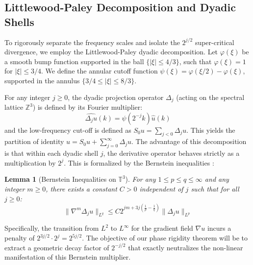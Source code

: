 \documentclass[12pt,a4paper]{article}
\theoremstyle{plain}
\newtheorem{lemma}[theorem]{Lemma}
\theoremstyle{definition}
\theoremstyle{remark}
\begin{document}
\subsection{Littlewood-Paley Decomposition and Dyadic Shells}
To rigorously separate the frequency scales and isolate the $2^{j/2}$ super-critical divergence, we employ the Littlewood-Paley dyadic decomposition. Let $\varphi(\xi)$ be a smooth bump function supported in the ball $\{|\xi| \leq 4/3\}$, such that $\varphi(\xi) = 1$ for $|\xi| \leq 3/4$. We define the annular cutoff function $\psi(\xi) = \varphi(\xi/2) - \varphi(\xi)$, supported in the annulus $\{3/4 \leq |\xi| \leq 8/3\}$.

For any integer $j \geq 0$, the dyadic projection operator $\Delta_j$ (acting on the spectral lattice $\mathbb{Z}^3$) is defined by its Fourier multiplier:
\begin{equation}
    \widehat{\Delta_j u}(k) = \psi(2^{-j} k) \hat{u}(k)
\end{equation}
and the low-frequency cut-off is defined as $S_0 u = \sum_{j < 0} \Delta_j u$. This yields the partition of identity $u = S_0 u + \sum_{j=0}^\infty \Delta_j u$. The advantage of this decomposition is that within each dyadic shell $j$, the derivative operator behaves strictly as a multiplication by $2^j$. This is formalized by the Bernstein inequalities \cite{chemin2004}:

\begin{lemma}[Bernstein Inequalities on $\mathbb{T}^3$]\label{lem:bernstein}
For any $1 \leq p \leq q \leq \infty$ and any integer $m \geq 0$, there exists a constant $C > 0$ independent of $j$ such that for all $j \geq 0$:
\begin{equation}
    \|\nabla^m \Delta_j u\|_{L^q} \leq C 2^{jm + 3j\left(\frac{1}{p} - \frac{1}{q}\right)} \|\Delta_j u\|_{L^p}
\end{equation}
\end{lemma}
Specifically, the transition from $L^2$ to $L^\infty$ for the gradient field $\nabla u$ incurs a penalty of $2^{3j/2} \cdot 2^j = 2^{5j/2}$. The objective of our phase rigidity theorem will be to extract a geometric decay factor of $2^{-j/2}$ that exactly neutralizes the non-linear manifestation of this Bernstein multiplier.
\end{document}
